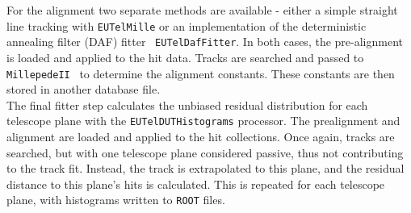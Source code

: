 For the alignment two separate methods are available - either a simple straight
line tracking with \texttt{EUTelMille} or an implementation of the deterministic
annealing filter (DAF) fitter~\cite{ref:daffitter} \texttt{EUTelDafFitter}. In
both cases, the pre-alignment is loaded and applied to the hit data. Tracks are
searched and passed to \texttt{MillepedeII}~\cite{ref:millepede} to determine
the alignment constants. These constants are then stored in another database
file.\\

The final fitter step calculates the unbiased residual distribution for each
telescope plane with the \texttt{EUTelDUTHistograms} processor. The prealignment
and alignment are loaded and applied to the hit collections. Once again, tracks
are searched, but with one telescope plane considered passive, thus not
contributing to the track fit. Instead, the track is extrapolated to this plane,
and the residual distance to this plane's hits is calculated. This is repeated
for each telescope plane, with histograms written to \texttt{ROOT} files.\\


